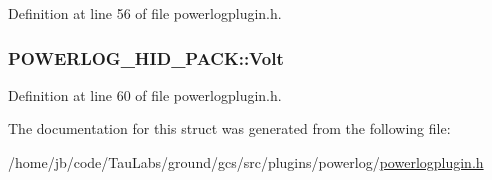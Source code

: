 \-Definition at line 56 of file powerlogplugin.\-h.

\hypertarget{struct_p_o_w_e_r_l_o_g___h_i_d___p_a_c_k_ad9cd709bfba747e457f92eb02eb01146}{
\subsubsection[{\-Volt}]{ {\bf \-P\-O\-W\-E\-R\-L\-O\-G\-\_\-\-H\-I\-D\-\_\-\-P\-A\-C\-K\-::\-Volt}}}\label{struct_p_o_w_e_r_l_o_g___h_i_d___p_a_c_k_ad9cd709bfba747e457f92eb02eb01146}


\-Definition at line 60 of file powerlogplugin.\-h.



\-The documentation for this struct was generated from the following file\-:\begin{DoxyCompactItemize}
\item 
/home/jb/code/\-Tau\-Labs/ground/gcs/src/plugins/powerlog/\hyperlink{powerlogplugin_8h}{powerlogplugin.\-h}\end{DoxyCompactItemize}
